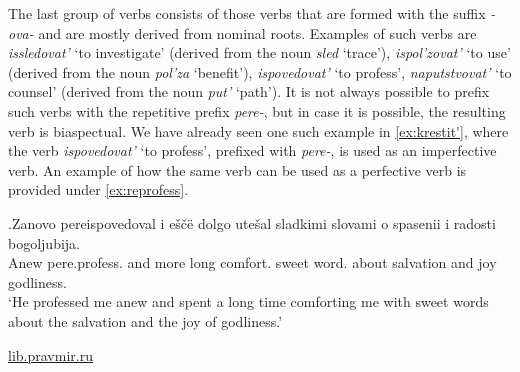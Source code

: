 The last group of verbs consists of those verbs that are formed with the suffix \textit{-ova-} and are mostly derived from nominal roots. Examples of such verbs are \textit{issledovat'} `to investigate' (derived from the noun \textit{sled} `trace'), \textit{ispol'zovat'} `to use' (derived from the noun \textit{pol'za} `benefit'), \textit{ispovedovat'} `to profess', \textit{naputstvovat'} `to counsel' (derived from the noun \textit{put'} `path'). It is not always possible to prefix such verbs with the repetitive prefix \textit{pere-}, but in case it is possible, the resulting verb is biaspectual. We have already seen one such example in \ref{ex:krestit'}, where the verb \textit{ispovedovat'} `to profess', prefixed with \textit{pere-}, is used as an imperfective verb. An example of how the same verb can be used as a perfective verb is provided under \ref{ex:reprofess}.

\exg.\label{ex:reprofess}Zanovo pereispovedoval i e\v{s}\v{c}\"{e} dolgo ute\v{s}al sladkimi slovami o spasenii i radosti bogoljubija.\\
Anew pere.profess. and more long comfort. sweet word. about salvation and joy godliness.\\
\vspace{0.5em}
`He professed me anew and spent a long time comforting me with sweet words about the salvation and the joy of godliness.'
\begin{flushright}
\vspace{-0.5em}
\url{lib.pravmir.ru}
\end{flushright}

